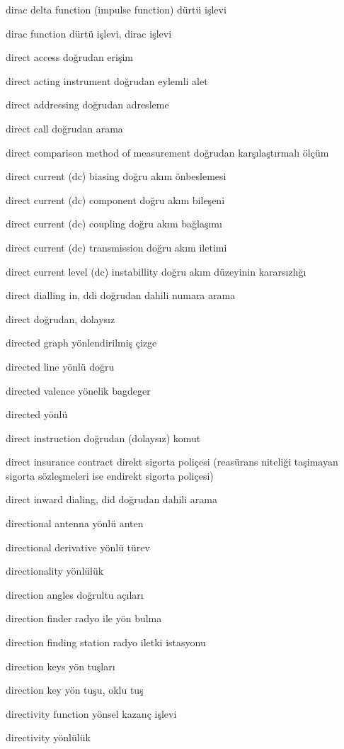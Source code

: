 \documentclass[12pt,fleqn]{article}\usepackage{../../common}
\begin{document}
dirac delta function (impulse function) dürtü işlevi

dirac function dürtü işlevi, dirac işlevi

direct access doğrudan erişim

direct acting instrument doğrudan eylemli alet

direct addressing doğrudan adresleme

direct call doğrudan arama

direct comparison method of measurement doğrudan karşılaştırmalı ölçüm

direct current (dc) biasing doğru akım önbeslemesi

direct current (dc) component doğru akım bileşeni

direct current (dc) coupling doğru akım bağlaşımı

direct current (dc) transmission doğru akım iletimi

direct current level (dc) instabillity doğru akım düzeyinin kararsızlığı

direct dialling in, ddi doğrudan dahili numara arama

direct doğrudan, dolaysız

directed graph yönlendirilmiş çizge

directed line yönlü doğru

directed valence yönelik bagdeger

directed yönlü

direct instruction doğrudan (dolaysız) komut

direct insurance contract direkt sigorta poliçesi (reasürans niteliği taşimayan sigorta sözleşmeleri ise endirekt sigorta poliçesi)

direct inward dialing, did doğrudan dahili arama

directional antenna yönlü anten

directional derivative yönlü türev

directionality yönlülük

direction angles doğrultu açıları

direction finder radyo ile yön bulma

direction finding station radyo iletki istasyonu

direction keys yön tuşları

direction key yön tuşu, oklu tuş

directivity function yönsel kazanç işlevi

directivity yönlülük
\end{document}
